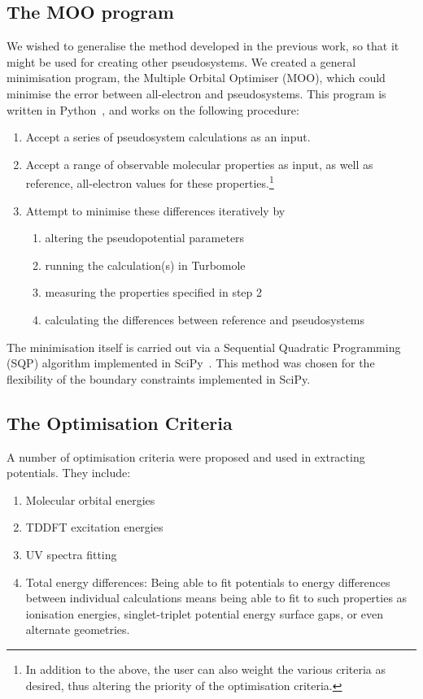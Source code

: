 \documentclass[aip,reprint,nofootinbib]{revtex4-1}
\begin{document}
\subsection{The MOO program}

We wished to generalise the method developed in the previous work, so that it might be used for creating other pseudosystems. We created a general minimisation program, the Multiple Orbital Optimiser (MOO), which could minimise the error between all-electron and pseudosystems. This program is written in Python~\cite{python}, and works on the following procedure:

\begin{enumerate}
\item Accept a series of pseudosystem calculations as an input. 
\item Accept a range of observable molecular properties as input, as well as reference, all-electron values for these properties.\footnote{In addition to the above, the user can also weight the various criteria as desired, thus altering the priority of the optimisation criteria.}
\item Attempt to minimise these differences iteratively by 
\begin{enumerate}
\item altering the pseudopotential parameters 
\item running the calculation(s) in Turbomole~\cite{TURBOMOLE}
\item measuring the properties specified in step 2 
\item calculating the differences between reference and pseudosystems
\end{enumerate}
\end{enumerate}

The minimisation itself is carried out via a Sequential Quadratic Programming (SQP) algorithm implemented in SciPy~\cite{scipy}. This method was chosen for the flexibility of the boundary constraints implemented in SciPy.

\subsection{The Optimisation Criteria}

A number of optimisation criteria were proposed and used in extracting potentials. They include: 

\begin{enumerate}
\item Molecular orbital energies
\item TDDFT excitation energies
\item UV spectra fitting
\item Total energy differences: Being able to fit potentials to energy differences between individual calculations means being able to fit to such properties as ionisation energies, singlet-triplet potential energy surface gaps, or even alternate geometries.
\end{enumerate}
\end{document}
